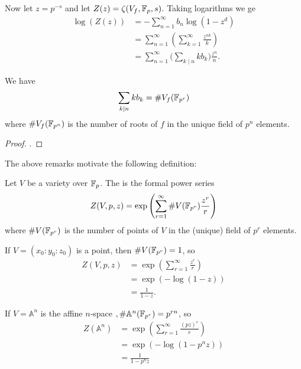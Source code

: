 \documentclass[12pt, a4paper]{report}
\begin{document}
Now let $z = p^{-s}$ and let $Z(z) = \zeta(V_f, \mathbb{F}_p, s)$. Taking logarithms
we ge
\begin{equation*}
  \begin{split}
    \log (Z(z)) &= - \sum\limits_{n=1}^\infty b_n \log(1-z^d) \\
    &= \sum\limits_{n=1}^\infty \left( \sum\limits_{k=1}^\infty \frac{z^{nk}}{k} \right) \\
    &= \sum\limits_{n=1}^\infty \big( \sum\limits_{k \mid n} kb_k \big) \frac{z^n}{n} .
  \end{split}
\end{equation*}

\begin{prop}
  We have
  \[\sum\limits_{k \mid n} kb_k = \# V_f(\mathbb{F}_{p^r})\]
  where $\# V_f(\mathbb{F}_{p^n})$ is the number of roots of $f$ in the unique field of
  $p^n$ elements.
\end{prop}
\begin{proof}
  \cite[See][Proposition VII-3.5, page 232]{lorenzini}.
\end{proof}

The above remarks motivate the following definition:

\begin{defn}
  Let $V$ be a variety over $\mathbb{F}_p$.
  The  is the formal power series
  \begin{equation} \label{zeta_defn}
    Z(V, p, z) = \exp \left( \sum\limits_{r=1}^{\infty} \# V(\mathbb{F}_{p^r}) \frac{z^r}{r} \right)
  \end{equation}
  where $\# V(\mathbb{F}_{p^r})$ is the number of points of $V$ in the (unique) field
  of $p^r$ elements.
\end{defn}

\begin{example}[Point]
  If $V = (x_0:y_0:z_0)$ is a point, then $\#V(\mathbb{F}_{p^r}) = 1$, so
  \begin{equation*}
    \begin{split}
      Z(V,p,z) &= \exp \left( \sum\limits_{r=1}^{\infty} \frac{z^r}{r} \right) \\
               &= \exp (-\log (1-z)) \\
               &= \frac{1}{1-z}.
    \end{split}
  \end{equation*}
             
\end{example}

\begin{example}
  If $V = \mathbb{A}^n$ is the affine
  $n$-space $, \#\mathbb{A}^n(\mathbb{F}_{p^r}) = p^{rn}$, so
  \begin{equation*}
    \begin{split}
      Z(\mathbb{A}^n) &= \exp \left(  \sum\limits_{r=1}^\infty \frac{(pz)^r}{r} \right) \\
      &= \exp ( - \log (1-p^nz) ) \\
      &= \frac{1}{1-p^nz}
    \end{split}
  \end{equation*}
\end{example}
\end{document}
